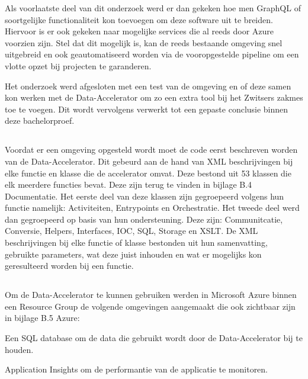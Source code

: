 Als voorlaatste deel van dit onderzoek werd er dan gekeken hoe men GraphQL of soortgelijke functionaliteit kon toevoegen om deze software uit te breiden. Hiervoor is er ook gekeken naar mogelijke services die al reeds door Azure voorzien zijn. Stel dat dit mogelijk is, kan de reeds bestaande omgeving snel uitgebreid en ook geautomatiseerd worden via de vooropgestelde pipeline om een vlotte opzet bij projecten te garanderen.

Het onderzoek werd afgesloten met een test van de omgeving en of deze samen kon werken met de Data-Accelerator om zo een extra tool bij het Zwitsers zakmes toe te voegen. Dit wordt vervolgens verwerkt tot een gepaste conclusie binnen deze bachelorproef.

\subsection{}%
\label{sec:Documentatie}

Voordat er een omgeving opgesteld wordt moet de code eerst beschreven worden van de Data-Accelerator. Dit gebeurd aan de hand van XML beschrijvingen bij elke functie en klasse die de accelerator omvat. Deze bestond uit 53 klassen die elk meerdere functies bevat. Deze zijn terug te vinden in bijlage B.4 Documentatie. Het eerste deel van deze klassen zijn gegroepeerd volgens hun functie namelijk: Activiteiten, Entrypoints en Orchestratie. Het tweede deel werd dan gegroepeerd op basis van hun ondersteuning. Deze zijn: Communitcatie, Conversie, Helpers, Interfaces, IOC, SQL, Storage en XSLT. De XML beschrijvingen bij elke functie of klasse bestonden uit hun samenvatting, gebruikte parameters, wat deze juist inhouden en wat er mogelijks kon geresulteerd worden bij een functie.

\subsection{}%
\label{sec:BICEP}

Om de Data-Accelerator te kunnen gebruiken werden in Microsoft Azure binnen een Resource Group de volgende omgevingen aangemaakt die ook zichtbaar zijn in bijlage B.5 Azure:

Een SQL database om de data die gebruikt wordt door de Data-Accelerator bij te houden.

Application Insights om de performantie van de applicatie te monitoren.

